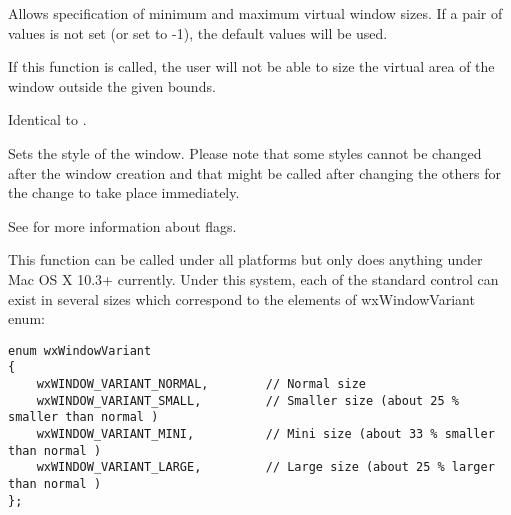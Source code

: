 Allows specification of minimum and maximum virtual window sizes.
If a pair of values is not set (or set to -1), the default values
will be used.









If this function is called, the user will not be able to size the virtual area
of the window outside the given bounds.


\label{wxwindowsetwindowstyle}


Identical to .


\label{wxwindowsetwindowstyleflag}


Sets the style of the window. Please note that some styles cannot be changed
after the window creation and that  might
be called after changing the others for the change to take place immediately.

See  for more information about flags.




\label{wxwindowsetwindowvariant}


This function can be called under all platforms but only does anything under
Mac OS X 10.3+ currently. Under this system, each of the standard control can
exist in several sizes which correspond to the elements of wxWindowVariant
enum:
\begin{verbatim}
enum wxWindowVariant
{
    wxWINDOW_VARIANT_NORMAL,        // Normal size
    wxWINDOW_VARIANT_SMALL,         // Smaller size (about 25 % smaller than normal )
    wxWINDOW_VARIANT_MINI,          // Mini size (about 33 % smaller than normal )
    wxWINDOW_VARIANT_LARGE,         // Large size (about 25 % larger than normal )
};
\end{verbatim}

